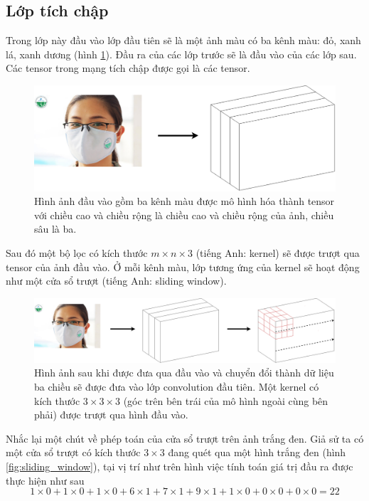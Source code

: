 \subsection{Lớp tích chập}
Trong lớp này đầu vào lớp đầu tiên sẽ là một ảnh màu có ba kênh màu: đỏ, xanh lá, xanh dương (hình \ref{fig:image_convol_0}). Đầu ra của các lớp trước sẽ là đầu vào của các lớp sau. Các tensor trong mạng tích chập được gọi là các tensor.
\begin{figure}[ht!]
	\centerline{\includegraphics[scale=0.2]{images/image_convol_0.png}}
  	\caption{Hình ảnh đầu vào gồm ba kênh màu được mô hình hóa thành tensor với chiều cao và chiều rộng là chiều cao và chiều rộng của ảnh, chiều sâu là ba.}
  	\label{fig:image_convol_0}
\end{figure}
Sau đó một bộ lọc có kích thước $m \times n \times 3$ (tiếng Anh: kernel) sẽ được trượt qua tensor của ảnh đầu vào. Ở mỗi kênh màu, lớp tương ứng của kernel sẽ hoạt động như một cửa sổ trượt (tiếng Anh: sliding window).
\begin{figure}[ht!]
	\centerline{\includegraphics[scale=0.2]{images/image_convol_1.png}}
  	\caption{Hình ảnh sau khi được đưa qua đầu vào và chuyển đổi thành dữ liệu ba chiều sẽ được đưa vào lớp convolution đầu tiên. Một kernel có kích thước $3 \times 3 \times 3$ (góc trên bên trái của mô hình ngoài cùng bên phải) được trượt qua hình đầu vào.}
  	\label{fig:image_convol_1}
\end{figure}
Nhắc lại một chút về phép toán của cửa sổ trượt trên ảnh trắng đen. Giả sử ta có một cửa sổ trượt có kích thước $3 \times 3$ đang quét qua một hình trắng đen (hình \ref{fig:sliding_window}), tại vị trí như trên hình việc tính toán giá trị đầu ra được thực hiện như sau
\begin{equation}
	1 \times 0 + 1 \times 0 + 1 \times 0 + 6 \times 1 + 7 \times 1 + 9 \times 1 + 1 \times 0 + 0 \times 0 + 0 \times 0 = 22 
\end{equation}

